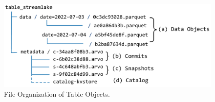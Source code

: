 \begin{figure}[htbp]
	
	\includegraphics[scale=0.3]{figures/tableobject}
	\centering
	\vspace{-1em}
	\caption{File Organization of \sys Table Objects.}
	\label{fig:tableobject}
	\vspace{-1em}
\end{figure}


















